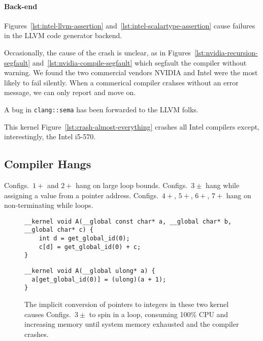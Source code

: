 \paragraph{Back-end} Figures~\ref{lst:intel-llvm-assertion} and~\ref{lst:intel-scalartype-assertion} cause failures in the LLVM code generator backend.

Occasionally, the cause of the crash is unclear, as in Figures~\ref{lst:nvidia-recursion-segfault} and~\ref{lst:nvidia-compile-segfault} which segfault the compiler without warning. We found the two commercial vendors NVIDIA and Intel were the most likely to fail silently. When a commerical compiler crahses without an error message, we can only report and move on.

A bug in \texttt{clang::sema} has been forwarded to the LLVM folks.

This kernel Figure~\ref{lst:crash-almost-everything} crashes all Intel compilers except, interestingly, the Intel i5-570.



\subsection{Compiler Hangs}

Configs.\ $1+$ and $2+$ hang on large loop bounds. Configs.\ $3\pm$ hang while assigning a value from a pointer address. Configs.\ $4+$, $5+$, $6+$, $7+$ hang on non-terminating while loops.

\begin{figure}
\begin{lstlisting}
__kernel void A(__global const char* a, __global char* b, __global char* c) {
	int d = get_global_id(0);
	c[d] = get_global_id(0) + c;
}
\end{lstlisting}
\begin{lstlisting}
__kernel void A(__global ulong* a) {
  a[get_global_id(0)] = (ulong)(a + 1);
}
\end{lstlisting}
\caption{The implicit conversion of pointers to integers in these two kernel causes Configs.\ $3\pm$ to spin in a loop, consuming 100\% CPU and increasing memory until system memory exhausted and the compiler crashes.}
\end{figure}

